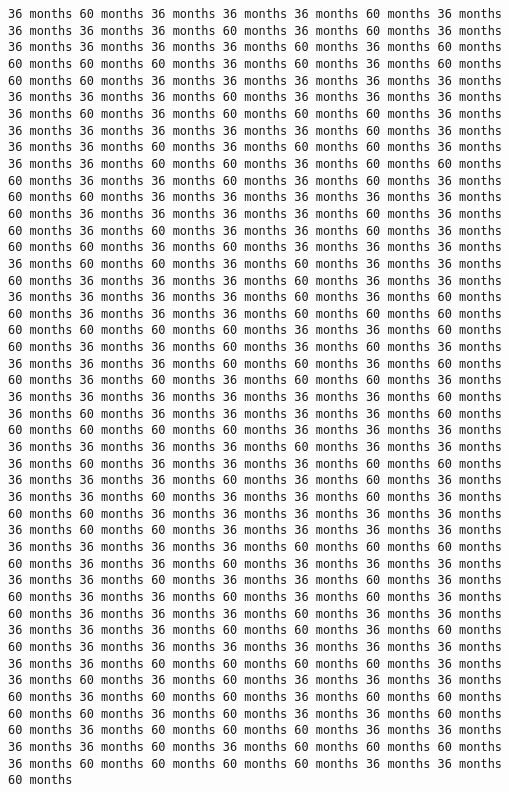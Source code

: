 \documentclass[11pt]{article}
\begin{document}
\begin{Verbatim}[commandchars=\\\{\}, frame=single, framerule=2mm, rulecolor=\color{outerrorbackground}]
36 months 60 months 36 months 36 months 36 months 60 months 36 months 36 months 36 months 36 months 60 months 36 months 60 months 36 months 36 months 36 months 36 months 36 months 60 months 36 months 60 months 60 months 60 months 60 months 36 months 60 months 36 months 60 months 60 months 60 months 36 months 36 months 36 months 36 months 36 months 36 months 36 months 36 months 60 months 36 months 36 months 36 months 36 months 60 months 36 months 60 months 60 months 60 months 36 months 36 months 36 months 36 months 36 months 36 months 60 months 36 months 36 months 36 months 60 months 36 months 60 months 60 months 36 months 36 months 36 months 60 months 60 months 36 months 60 months 60 months 60 months 36 months 36 months 60 months 36 months 60 months 36 months 60 months 60 months 36 months 36 months 36 months 36 months 36 months 60 months 36 months 36 months 36 months 36 months 60 months 36 months 60 months 36 months 60 months 36 months 36 months 60 months 36 months 60 months 60 months 36 months 60 months 36 months 36 months 36 months 36 months 60 months 60 months 36 months 60 months 36 months 36 months 60 months 36 months 36 months 36 months 60 months 36 months 36 months 36 months 36 months 36 months 36 months 60 months 36 months 60 months 60 months 36 months 36 months 36 months 60 months 60 months 60 months 60 months 60 months 60 months 60 months 36 months 36 months 60 months 60 months 36 months 36 months 60 months 36 months 60 months 36 months 36 months 36 months 36 months 60 months 60 months 36 months 60 months 60 months 36 months 60 months 36 months 60 months 60 months 36 months 36 months 36 months 36 months 36 months 36 months 36 months 60 months 36 months 60 months 36 months 36 months 36 months 36 months 60 months 60 months 60 months 60 months 60 months 36 months 36 months 36 months 36 months 36 months 36 months 36 months 60 months 36 months 36 months 36 months 60 months 36 months 36 months 36 months 60 months 60 months 36 months 36 months 36 months 60 months 36 months 60 months 36 months 36 months 36 months 60 months 36 months 36 months 60 months 36 months 60 months 60 months 36 months 36 months 36 months 36 months 36 months 36 months 60 months 60 months 36 months 36 months 36 months 36 months 36 months 36 months 36 months 36 months 60 months 60 months 60 months 60 months 36 months 36 months 60 months 36 months 36 months 36 months 36 months 36 months 60 months 36 months 36 months 60 months 36 months 60 months 36 months 36 months 60 months 36 months 60 months 36 months 60 months 36 months 36 months 36 months 60 months 36 months 36 months 36 months 36 months 36 months 60 months 60 months 36 months 60 months 60 months 36 months 36 months 36 months 36 months 36 months 36 months 36 months 36 months 60 months 60 months 60 months 60 months 36 months 36 months 60 months 36 months 60 months 36 months 36 months 36 months 60 months 36 months 60 months 60 months 36 months 60 months 60 months 60 months 60 months 36 months 60 months 36 months 36 months 60 months 60 months 36 months 60 months 60 months 60 months 36 months 36 months 36 months 36 months 60 months 36 months 60 months 60 months 60 months 36 months 60 months 60 months 60 months 60 months 36 months 36 months 60 months 
\end{Verbatim}
\end{document}
